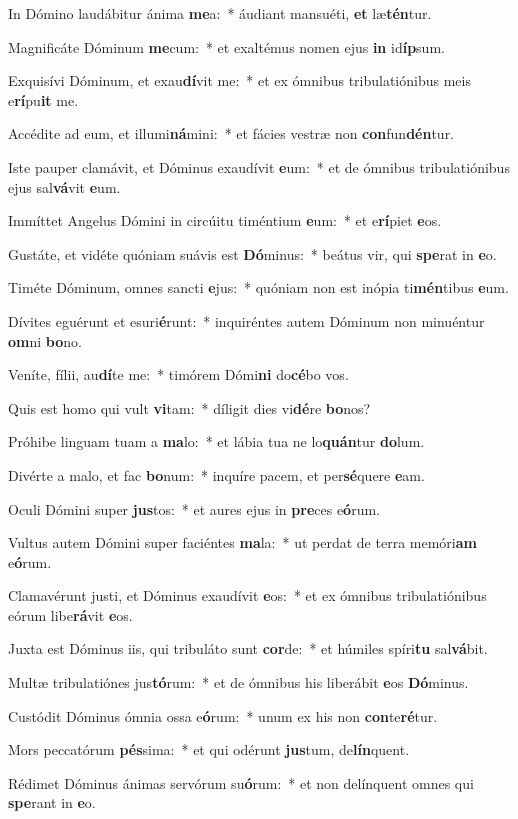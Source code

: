 \item In Dómino laudábitur ánima \textbf{me}a:~* áudiant mansuéti, \textbf{et} læ\textbf{tén}tur.
\item Magnificáte Dóminum \textbf{me}cum:~* et exaltémus nomen ejus \textbf{in} id\textbf{íp}sum.
\item Exquisívi Dóminum, et exau\textbf{dí}vit me:~* et ex ómnibus tribulatiónibus meis e\textbf{rí}pu\textbf{it} me.
\item Accédite ad eum, et illumi\textbf{ná}mini:~* et fácies vestræ non \textbf{con}fun\textbf{dén}tur.
\item Iste pauper clamávit, et Dóminus exaudívit \textbf{e}um:~* et de ómnibus tribulatiónibus ejus sal\textbf{vá}vit \textbf{e}um.
\item Immíttet Angelus Dómini in circúitu timéntium \textbf{e}um:~* et e\textbf{rí}piet \textbf{e}os.
\item Gustáte, et vidéte quóniam suávis est \textbf{Dó}minus:~* beátus vir, qui \textbf{spe}rat in \textbf{e}o.
\item Timéte Dóminum, omnes sancti \textbf{e}jus:~* quóniam non est inópia ti\textbf{mén}tibus \textbf{e}um.
\item Dívites eguérunt et esuri\textbf{é}runt:~* inquiréntes autem Dóminum non minuéntur \textbf{om}ni \textbf{bo}no.
\item Veníte, fílii, au\textbf{dí}te me:~* timórem Dómi\textbf{ni} do\textbf{cé}bo vos.
\item Quis est homo qui vult \textbf{vi}tam:~* díligit dies vi\textbf{dé}re \textbf{bo}nos?
\item Próhibe linguam tuam a \textbf{ma}lo:~* et lábia tua ne lo\textbf{quán}tur \textbf{do}lum.
\item Divérte a malo, et fac \textbf{bo}num:~* inquíre pacem, et per\textbf{sé}quere \textbf{e}am.
\item Oculi Dómini super \textbf{jus}tos:~* et aures ejus in \textbf{pre}ces e\textbf{ó}rum.
\item Vultus autem Dómini super faciéntes \textbf{ma}la:~* ut perdat de terra memóri\textbf{am} e\textbf{ó}rum.
\item Clamavérunt justi, et Dóminus exaudívit \textbf{e}os:~* et ex ómnibus tribulatiónibus eórum libe\textbf{rá}vit \textbf{e}os.
\item Juxta est Dóminus iis, qui tribuláto sunt \textbf{cor}de:~* et húmiles spíri\textbf{tu} sal\textbf{vá}bit.
\item Multæ tribulatiónes jus\textbf{tó}rum:~* et de ómnibus his liberábit \textbf{e}os \textbf{Dó}minus.
\item Custódit Dóminus ómnia ossa e\textbf{ó}rum:~* unum ex his non \textbf{con}te\textbf{ré}tur.
\item Mors peccatórum \textbf{pés}sima:~* et qui odérunt \textbf{jus}tum, de\textbf{lín}quent.
\item Rédimet Dóminus ánimas servórum su\textbf{ó}rum:~* et non delínquent omnes qui \textbf{spe}rant in \textbf{e}o.
